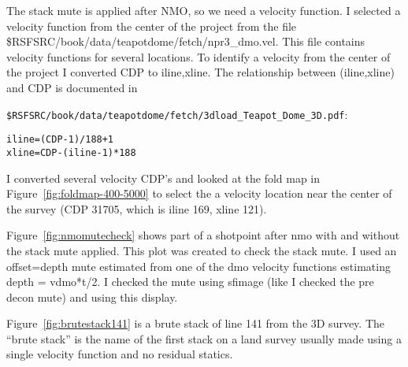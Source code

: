 The stack mute is applied after NMO, so we need a velocity function.  I selected a velocity function from the center of the project from the file \$RSFSRC/book/data/teapotdome/fetch/npr3\_dmo.vel. This file contains velocity functions for several locations.  To identify a velocity from the center of the project I converted CDP to iline,xline.  The relationship between (iline,xline) and CDP is documented in 

\texttt{\$RSFSRC/book/data/teapotdome/fetch/3dload\_Teapot\_Dome\_3D.pdf}:

\begin{verbatim}  
iline=(CDP-1)/188+1
xline=CDP-(iline-1)*188
\end{verbatim}  

I converted several velocity CDP’s and looked at the fold map in Figure~\ref{fig:foldmap-400-5000} to select the a velocity location near the center of the survey (CDP 31705, which is iline 169, xline 121).

Figure~\ref{fig:nmomutecheck} shows part of a shotpoint after nmo with and without the stack mute applied.  This plot was created to check the stack mute.  I used an offset=depth mute estimated from one of the dmo velocity functions estimating depth = vdmo*t/2.   I checked the mute using sfimage (like I checked the pre decon mute) and using this display.

Figure~\ref{fig:brutestack141} is a brute stack of line 141 from the 3D survey.  The “brute stack” is the name of the first stack on a land survey usually made using a single velocity function and no residual statics.






